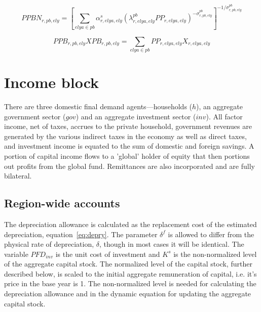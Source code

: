 \documentclass[11pt,letterpaper]{report}
\begin{document}
\begin{equation}
\label{eq:PPBN}
\mathit{PPBN}_{r,\mathit{pb},\mathit{ely}} =
   \left[ \sum_{\mathit{elya} \in \mathit{pb}} {
      \alpha^s_{r,\mathit{elya},\mathit{ely}}
      \left( \lambda^{\mathit{pb}}_{r,\mathit{elya},\mathit{ely}}
         \mathit{PP}_{r,\mathit{elya},\mathit{ely}}
      \right)^{-\sigma^{\mathit{pb}}_{r,\mathit{pb},\mathit{ely}}}}
   \right]^{-1/\sigma^{\mathit{pb}}_{r,\mathit{pb},\mathit{ely}}}
\end{equation}

\begin{equation}
\label{eq:PPB}
\mathit{PPB}_{r,\mathit{pb},\mathit{ely}}
      \mathit{XPB}_{r,\mathit{pb},\mathit{ely}} =
   \sum_{\mathit{elya} \in \mathit{pb}} {
      \mathit{PP}_{r,\mathit{elya},\mathit{ely}}
         \mathit{X}_{r,\mathit{elya},\mathit{ely}}
   }
\end{equation}

\section{Income block}
\renewcommand{\theequation}{{Y-}\arabic{equation}}
\setcounter{equation}{0}
\label{sec:income}

There are three domestic final demand agents---households ($h$), an aggregate
government sector ($\mathit{gov}$) and an aggregate investment sector
($\mathit{inv}$). All factor income, net of taxes, accrues to the private
household, government revenues are generated by the various indirect taxes in
the economy as well as direct taxes, and investment income is equated to the sum
of domestic and foreign savings. A portion of capital income flows to a 'global'
holder of equity that then portions out profits from the global fund.
Remittances are also incorporated and are fully bilateral.

\subsection{Region-wide accounts}

The depreciation allowance is calculated as the replacement cost of the
estimated depreciation, equation~\ref{eq:depry}. The parameter $\delta^f$ is
allowed to differ from the physical rate of depreciation, $\delta$, though in
most cases it will be identical. The variable $\mathit{PFD_{inv}}$ is the unit
cost of investment and $\mathit{K^s}$ is the non-normalized level of the
aggregate capital stock. The normalized level of the capital stock, further
described below, is scaled to the initial aggregate remuneration of capital,
i.e. it's price in the base year is 1. The non-normalized level is needed for
calculating the depreciation allowance and in the dynamic equation for updating
the aggregate capital stock.
\end{document}
